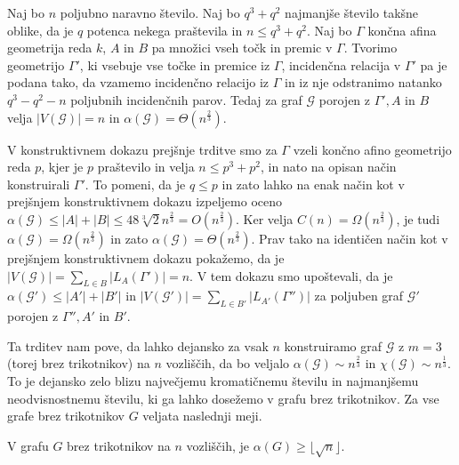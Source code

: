 \documentclass[mat1, tisk]{fmfdelo}
\begin{document}
    \begin{trditev}
        Naj bo $n$ poljubno naravno število. Naj bo $q^3 + q^2$ najmanjše število takšne oblike, da je $q$ potenca nekega praštevila in $n \leq q^3 + q^2$. Naj bo $\Gamma$ končna afina geometrija reda $k$, $A$ in $B$ pa množici vseh točk in premic v $\Gamma$. Tvorimo geometrijo $\Gamma'$,
        ki vsebuje vse točke in premice iz $\Gamma$, incidenčna relacija v $\Gamma'$ pa je podana tako, da vzamemo incidenčno relacijo iz $\Gamma$ in iz nje odstranimo natanko $q^3 - q^2 - n$ poljubnih incidenčnih parov. Tedaj za graf $\mathcal{G}$ porojen z $\Gamma', A$ in $B$ velja $|V(\mathcal{G})| = n$ in $\alpha(\mathcal{G}) = \Theta(n^{\frac{2}{3}})$. 
    \end{trditev}

    \begin{dokaz}
        V konstruktivnem dokazu prejšnje trditve smo za $\Gamma$ vzeli končno afino geometrijo reda $p$, kjer je $p$ praštevilo in velja $n \leq p^3 + p^2$, in nato na opisan način konstruirali $\Gamma'$. To pomeni, da je $q \leq p$ in zato lahko na enak način kot v prejšnjem konstruktivnem dokazu izpeljemo oceno $\alpha(\mathcal{G}) \leq |A| + |B| \leq 48\sqrt[3]{2}n^{\frac{2}{3}} = O(n^{\frac{2}{3}})$. 
        Ker velja $C(n) = \Omega(n^{\frac{2}{3}})$, je tudi $\alpha(\mathcal{G}) = \Omega(n^{\frac{2}{3}})$ in zato $\alpha(\mathcal{G}) = \Theta(n^{\frac{2}{3}})$. Prav tako na identičen način kot v prejšnjem konstruktivnem dokazu pokažemo, da je $|V(\mathcal{G})| = \sum_{L \in B}|L_A(\Gamma')| = n$. V tem dokazu smo upoštevali, da je $\alpha(\mathcal{G'}) \leq |A'| + |B'|$
        in $|V(\mathcal{G'})| = \sum_{L \in B'}|L_{A'}(\Gamma'')|$ za poljuben graf $\mathcal{G'}$ porojen z $\Gamma'', A'$ in $B'$.
    \end{dokaz}

Ta trditev nam pove, da lahko dejansko za vsak $n$ konstruiramo graf $\mathcal{G}$ z $m = 3$ (torej brez trikotnikov) na $n$ vozliščih, da bo veljalo $\alpha(\mathcal{G}) \sim n^{\frac{2}{3}}$ in $\chi(\mathcal{G}) \sim n^{\frac{1}{3}}$. To je dejansko zelo blizu največjemu kromatičnemu številu in najmanjšemu neodvisnostnemu številu, 
ki ga lahko dosežemo v grafu brez trikotnikov. Za vse grafe brez trikotnikov $G$ veljata naslednji meji.

    \begin{trditev}
        V grafu $G$ brez trikotnikov na $n$ vozliščih, je $\alpha(G) \geq \lfloor\sqrt{n}\rfloor$.
    \end{trditev}
\end{document}
